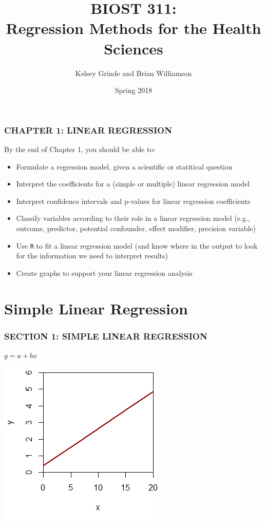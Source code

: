 \documentclass[12pt, 
hyperref={colorlinks=true, linkcolor=blue, urlcolor=cyan},dvipsnames]{beamer}
\title{BIOST 311: \\ Regression Methods for the Health Sciences}
\author{Kelsey Grinde and Brian Williamson}
\institute{UW Biostatistics}
\date{Spring 2018}
\begin{document}
\begin{frame}
\titlepage\thispagestyle{empty}
\end{frame}

  
\setcounter{framenumber}{\value{chap1}}

\begin{frame}
\frametitle{CHAPTER 1: LINEAR REGRESSION}
By the end of Chapter 1, you should be able to: \vspace{-0.3cm}

\begin{itemize}
\item Formulate a regression model, given a scientific or statitical question
\item Interpret the coefficients for a (simple or multiple) linear regression model
\item Interpret confidence intervals and p-values for linear regression coefficients
\item Classify variables according to their role in a linear regression model (e.g., outcome, predictor, potential confounder, effect modifier, precision variable)
\item Use \texttt{R} to fit a linear regression model (and know where in the output to look for the information we need to interpret results)
\item Create graphs to support your linear regression analysis
\end{itemize}

\end{frame}

\section{Simple Linear Regression}
\begin{frame}
\frametitle{SECTION 1: SIMPLE LINEAR REGRESSION}

\center 
\color{red} \begin{large} $y = a + bx$ \end{large} 

\vspace{-0.2cm} \includegraphics{./plots/plot_y_vs_x}

\end{frame}
\end{document}
